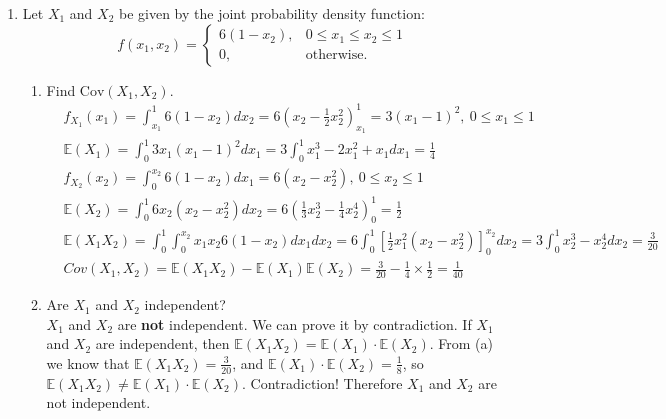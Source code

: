 \documentclass[11pt]{article}
\newcommand{\e}{\mathbb{E}}
\newcommand{\cov}{\text{Cov}}
\begin{document}
\begin{enumerate}[label=\textbf{Question \arabic*:},start=1]
\item Let $X_1$ and $X_2$ be given by the joint probability density function:
\[
f(x_1,x_2) =
\begin{cases}
	6(1-x_2),	& 0\leq x_1\leq x_2\leq 1 \\
	0,		& \text{otherwise}.
\end{cases}
\]
\begin{enumerate}
	\item Find $\cov(X_1,X_2)$.
	\begin{align*}
	& f_{X_1}(x_1) = \int_{x_1}^{1} 6 (1 - x_2) dx_2 = 6 (x_2 - \frac{1}{2} x_2^2)_{x_1}^1 = 3 (x_1 - 1)^2,\ 0 \leq x_1 \leq 1 \\
	& \e{(X_1)} = \int_0^1 3x_1(x_1 - 1)^2 dx_1 = 3 \int_0^1 x_1^3 - 2x_1^2 + x_1 dx_1 = \frac{1}{4} \\
	& f_{X_2}(x_2) = \int_0^{x_2} 6(1-x_2) dx_1 = 6(x_2 - x_2^2),\ 0 \leq x_2 \leq 1 \\
	& \e{(X_2)} = \int_0^1 6 x_2 (x_2 - x_2^2) dx_2 = 6 (\frac{1}{3} x_2^3 - \frac{1}{4} x_2^4)_0^1 = \frac{1}{2} \\
	& \e{(X_1X_2)} = \int_0^1 \int_0^{x_2} x_1 x_2 6 (1-x_2) dx_1 dx_2 =  6 \int_0^1 [\frac{1}{2} x_1^2 (x_2 - x_2^2)]_0^{x_2} dx_2 = 3 \int_0^1 x_2^3 - x_2^4 dx_2 = \frac{3}{20} \\
	& Cov(X_1, X_2) = \e{(X_1X_2)} - \e{(X_1)}\e{(X_2)} = \frac{3}{20} - \frac{1}{4} \times \frac{1}{2} = \frac{1}{40}
	\end{align*}
	
	\item Are $X_1$ and $X_2$ independent?\\
	
	$X_1$ and $X_2$ are \textbf{not} independent. We can prove it by contradiction. If $X_1$ and $X_2$ are independent, then $\e{(X_1X_2)} = \e{(X_1)} \cdot \e{(X_2)}$. From (a) we know that $\e{(X_1X_2)} = \frac{3}{20}$, and $\e{(X_1)} \cdot \e{(X_2)} = \frac{1}{8}$,  so $\e{(X_1X_2)} \neq \e{(X_1)} \cdot \e{(X_2)}$. Contradiction! Therefore $X_1$ and $X_2$ are not independent.\\


\end{enumerate}
\end{enumerate}
\end{document}
